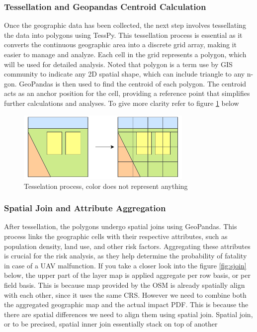 \documentclass[12pt]{report}
\begin{document}
        \subsubsection{Tessellation and Geopandas Centroid Calculation}
        Once the geographic data has been collected, the next step involves tessellating the data into polygons using
        TessPy. This tessellation process is essential as it converts the continuous geographic area into a discrete
        grid array, making it easier to manage and analyze. Each cell in the grid represents a polygon, which will be
        used for detailed analysis. Noted that polygon is a term use by GIS community to indicate any 2D spatial shape,
        which can include triangle to any n-gon. GeoPandas is then used to find the centroid of each polygon. The
        centroid acts as an anchor position for the cell, providing a reference point that simplifies further
        calculations and analyses. To give more clarity refer to figure \ref{fig:tassel} below

        \begin{figure}[H]
            \centering
            \includegraphics[width=0.75\textwidth]{General Image/OSM Drone-Tessel.pdf}
            \caption{Tesselation process, color does not represent anything}
            \label{fig:tassel}
        \end{figure}
            
        \subsubsection{Spatial Join and Attribute Aggregation}
        After tessellation, the polygons undergo spatial joins using GeoPandas. This process links the geographic cells
        with their respective attributes, such as population density, land use, and other risk factors. Aggregating
        these attributes is crucial for the risk analysis, as they help determine the probability of fatality in case of
        a UAV malfunction. If you take a closer look into the figure \ref{fig:sjoin} below, the upper part of the layer
        map is applied aggregate per row basis, or per field basis. This is because map provided by the OSM is already
        spatially align with each other, since it uses the same CRS. However we need to combine both the aggregated
        geographic map and the actual impact PDF. This is because the there are spatial differences we need to align
        them using spatial join. Spatial join, or to be precised, spatial inner join essentially stack on top of another
\end{document}
